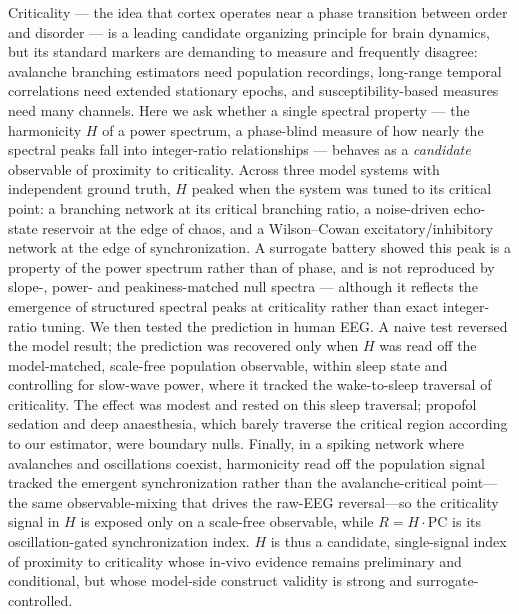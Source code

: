 \documentclass[11pt]{article}
\begin{document}
{\small Criticality --- the idea that cortex operates near a phase transition between order and disorder --- is a leading candidate organizing principle for brain dynamics, but its standard markers are demanding to measure and frequently disagree: avalanche branching estimators need population recordings, long-range temporal correlations need extended stationary epochs, and susceptibility-based measures need many channels. Here we ask whether a single spectral property --- the harmonicity $H$ of a power spectrum, a phase-blind measure of how nearly the spectral peaks fall into integer-ratio relationships --- behaves as a \emph{candidate} observable of proximity to criticality. Across three model systems with independent ground truth, $H$ peaked when the system was tuned to its critical point: a branching network at its critical branching ratio, a noise-driven echo-state reservoir at the edge of chaos, and a Wilson--Cowan excitatory/inhibitory network at the edge of synchronization. A surrogate battery showed this peak is a property of the power spectrum rather than of phase, and is not reproduced by slope-, power- and peakiness-matched null spectra --- although it reflects the emergence of structured spectral peaks at criticality rather than exact integer-ratio tuning. We then tested the prediction in human EEG. A naive test reversed the model result; the prediction was recovered only when $H$ was read off the model-matched, scale-free population observable, within sleep state and controlling for slow-wave power, where it tracked the wake-to-sleep traversal of criticality. The effect was modest and rested on this sleep traversal; propofol sedation and deep anaesthesia, which barely traverse the critical region according to our estimator, were boundary nulls. Finally, in a spiking network where avalanches and oscillations coexist, harmonicity read off the population signal tracked the emergent synchronization rather than the avalanche-critical point---the same observable-mixing that drives the raw-EEG reversal---so the criticality signal in $H$ is exposed only on a scale-free observable, while $R=H\cdot\mathrm{PC}$ is its oscillation-gated synchronization index. $H$ is thus a candidate, single-signal index of proximity to criticality whose in-vivo evidence remains preliminary and conditional, but whose model-side construct validity is strong and surrogate-controlled.\par}
\vspace{10pt}
\end{document}
